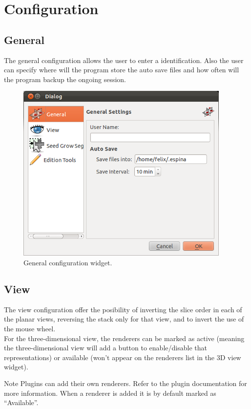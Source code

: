\section{Configuration}

\subsection{General}

The general configuration allows the user to enter a identification. Also the user can specify where will the program store the auto save files and how often will the program backup the ongoing session.

\begin{figure}[H]
\centering
\includegraphics[scale=0.75]{fig/Configuration-general}
\caption{General configuration widget.}
\end{figure}

\subsection{View}

The view configuration offer the posibility of inverting the slice order in each of the planar views, reversing the stack only for that view, and to invert the use of the mouse wheel. \\
For the three-dimensional view, the renderers can be marked as active (meaning the three-dimensional view will add a button to enable/disable that representations) or available (won't appear on the renderers list in the 3D view widget).
\vspace{0.3cm}
\begin{bclogo}[couleur = yellow!33, logo=\bcattention]
{Note} Plugins can add their own renderers. Refer to the plugin documentation for more information.
When a renderer is added it is by default marked as ``Available''.
\end{bclogo}

